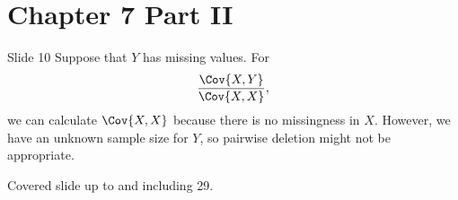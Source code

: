 \section*{Chapter 7 Part II}
\begin{Regular}{Slide 10}
    Suppose that $ Y $ has missing values. For
    \[ \frac{\Cov{X,Y}}{\Cov{X,X}}, \]
    we can calculate $ \Cov{X,X} $ because there is no missingness in $ X $.
    However, we have an unknown sample size for $ Y $, so pairwise
    deletion might not be appropriate.
\end{Regular}
Covered slide up to and including 29.